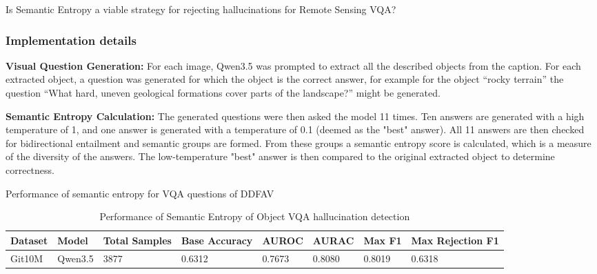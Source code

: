 \begin{formal}
	Is Semantic Entropy a viable strategy for rejecting hallucinations for Remote Sensing VQA?
\end{formal}


\subsubsection{Implementation details}

\begin{description}
	\item \textbf{Visual Question Generation:} For each image, Qwen3.5 was prompted to extract all the described objects from the caption. For each extracted object, a question was generated for which the object is the correct answer, for example for the object ``rocky terrain'' the question ``What hard, uneven geological formations cover parts of the landscape?'' might be generated.

	\item \textbf{Semantic Entropy Calculation:} The generated questions were then asked the model 11 times. Ten answers are generated with a high temperature of 1, and one answer is generated with a temperature of 0.1 (deemed as the "best" answer). All 11 answers are then checked for bidirectional entailment and semantic groups are formed. From these groups a semantic entropy score is calculated, which is a measure of the diversity of the answers. The low-temperature "best" answer is then compared to the original extracted object to determine correctness.
\end{description}

\begin{table}[htb] \caption{Performance of semantic entropy for VQA questions of DDFAV} \centering
\end{table}

\begin{table}[htb] \caption{Performance of Semantic Entropy of Object VQA hallucination detection} \centering
	\centering
	\begin{tabular}{llllllll} %
		\toprule
		Dataset & Model   & Total Samples & Base Accuracy & AUROC  & AURAC  & Max F1 & Max Rejection F1 \\
		\midrule
		Git10M  & Qwen3.5 & 3877          & 0.6312        & 0.7673 & 0.8080 & 0.8019 & 0.6318           \\
		\bottomrule
	\end{tabular}
	\label{tab:semantic_entropy_object_vqa }
\end{table}

